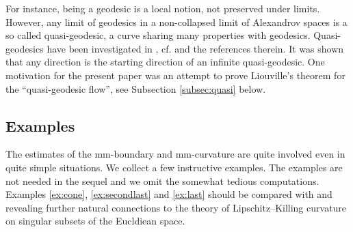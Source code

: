 \documentclass[12pt,leqno]{amsart}
\numberwithin{equation}{section}
\theoremstyle{definition}
\theoremstyle{remark}
\begin{document}
For instance,  being a geodesic is a local notion, not preserved under limits.  However, any limit of geodesics  in  a non-collapsed
limit  of Alexandrov spaces  is a so called quasi-geodesic, a  curve sharing many properties with geodesics.  Quasi-geodesics have been investigated  in \cite{PP}, cf. \cite{Petsemi} and the references therein. It was shown that any direction is the starting direction of an infinite quasi-geodesic.
One motivation for the present paper was an attempt to prove Liouville's theorem for the ``quasi-geodesic flow'', see Subsection
\ref{subsec:quasi} below.





\subsection{Examples} \label{subsec:example}
The estimates of the   mm-boundary and mm-curvature are quite involved even in  quite  simple situations.
We collect a few instructive examples. %
The examples  are not  needed in the sequel and we omit the somewhat tedious computations.   Examples \ref{ex:cone}, \ref{ex:secondlast} and \ref{ex:last} should be compared with
\cite{Bernig-CAT} and \cite{Bernig-Alex} revealing further natural connections to the theory of Lipschitz--Killing curvature on singular subsets of the Eucldiean space.
\end{document}
